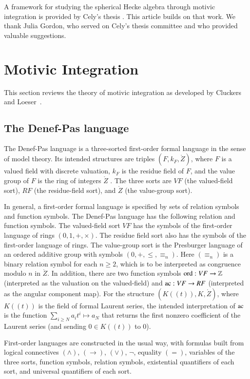 A framework for studying the spherical Hecke algebra through motivic integration is provided by Cely's thesis \cite{cely}.
This article builds on that work.  We thank Julia Gordon, who served on Cely's thesis committee and who provided valuable suggestions.


\section{Motivic Integration}

This section reviews the theory of motivic integration as developed by Cluckers and
Loeser~\cite{cluckers2008constructible}.  

\subsection{The Denef-Pas language}

The Denef-Pas language is a three-sorted first-order formal language in the sense of model theory.  
Its intended structures are triples $(F,k_F,\ring{Z})$, 
where $F$ is a valued field with discrete valuation, 
$k_F$ is the residue field of $F$, 
and the value group of $F$ is the ring of integers $\ring{Z}$ . 
The three sorts are $VF$ (the valued-field sort), $RF$ (the residue-field sort), and $\ring{Z}$ (the value-group sort).

In general, a first-order formal language is specified by sets of relation symbols and function symbols.
The Denef-Pas language has the following relation and function symbols.  
The valued-field sort $VF$ has the symbols of the first-order language of rings $(0,1,+,\times)$.  
The residue field sort also has the symbols of the first-order language of rings.  
The value-group sort is the Presburger language of an ordered additive group with symbols $(0,+,\le,\equiv_n)$.  
Here $(\equiv_n)$ is a binary relation symbol for each $n\ge 2$, which is to be interpreted as congruence modulo $n$ in $\ring{Z}$.
In addition, there are two function symbols ${\operatorname{ord}}:VF\to\mathbb{Z}$ (interpreted as the valuation on the valued-field) and ${\operatorname{ac}}:VF\to RF$ 
(interpreted as the angular component map).  
For the structure $(K((t)),K,\ring{Z})$, where $K((t))$ is the field of formal Laurent series, 
the intended interpretation of ${\operatorname{ac}}$ 
is the function $\sum_{i\ge N} a_i t^i\mapsto a_N$ 
that returns the first nonzero coefficient of the Laurent series (and sending $0\in K((t))$ to $0$).

First-order languages are constructed in the usual way, with formulas built from logical connectives $(\land)$, $(\to)$, $(\lor)$, $\neg$, equality
$(=)$, variables of the three sorts, function symbols, relation symbols, existential quantifiers of each sort, and universal quantifiers of each sort.


